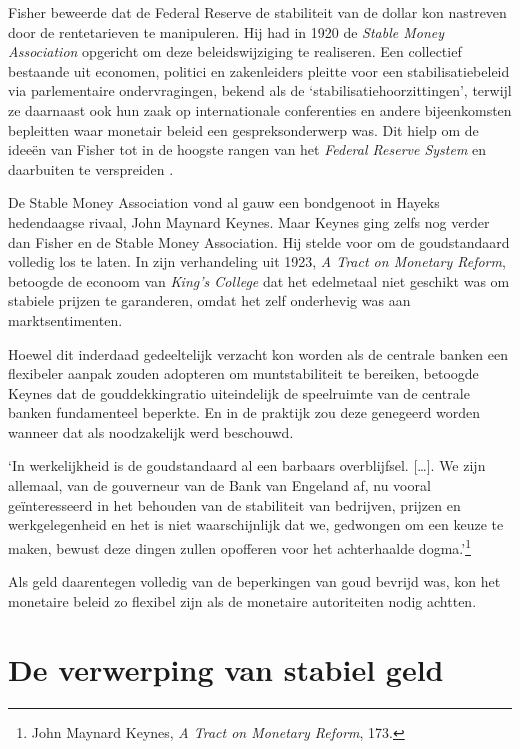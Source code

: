 \documentclass[
  a5paper,
  smalldemyvopaper,11pt,twoside,onecolumn,openright,extrafontsizes,
hidelinks]{memoir}
\renewenvironment{quote}%
               {\list{}{\rightmargin=.3cm\leftmargin=.3cm}%
                \itshape \item[]}%
               {\endlist}
\begin{document}
Fisher beweerde dat de Federal Reserve de stabiliteit van de dollar kon
nastreven door de rentetarieven te manipuleren. Hij had in 1920 de
\emph{Stable Money Association} opgericht om deze beleidswijziging te
realiseren. Een collectief bestaande uit economen, politici en
zakenleiders pleitte voor een stabilisatiebeleid via parlementaire
ondervragingen, bekend als de `stabilisatiehoorzittingen', terwijl ze
daarnaast ook hun zaak op internationale conferenties en andere
bijeenkomsten bepleitten waar monetair beleid een gespreksonderwerp was.
Dit hielp om de ideeën van Fisher tot in de hoogste rangen van het
\emph{Federal Reserve System} en daarbuiten te verspreiden .

De Stable Money Association vond al gauw een bondgenoot in Hayeks
hedendaagse rivaal, John Maynard Keynes. Maar Keynes ging zelfs nog
verder dan Fisher en de Stable Money Association. Hij stelde voor om de
goudstandaard volledig los te laten. In zijn verhandeling uit 1923,
\emph{A Tract on Monetary Reform}, betoogde de econoom van \emph{King's
College} dat het edelmetaal niet geschikt was om stabiele prijzen te
garanderen, omdat het zelf onderhevig was aan marktsentimenten.

Hoewel dit inderdaad gedeeltelijk verzacht kon worden als de centrale
banken een flexibeler aanpak zouden adopteren om muntstabiliteit te
bereiken, betoogde Keynes dat de gouddekkingratio uiteindelijk de
speelruimte van de centrale banken fundamenteel beperkte. En in de
praktijk zou deze genegeerd worden wanneer dat als noodzakelijk werd
beschouwd.

\begin{quote}
`In werkelijkheid is de goudstandaard al een barbaars overblijfsel.
{[}\ldots{]}. We zijn allemaal, van de gouverneur van de Bank van
Engeland af, nu vooral geïnteresseerd in het behouden van de stabiliteit
van bedrijven, prijzen en werkgelegenheid en het is niet waarschijnlijk
dat we, gedwongen om een keuze te maken, bewust deze dingen zullen
opofferen voor het achterhaalde dogma.'\footnote{\hspace{0pt}John
  Maynard Keynes, \emph{A Tract on Monetary Reform}, 173.}
\end{quote}

Als geld daarentegen volledig van de beperkingen van goud bevrijd was,
kon het monetaire beleid zo flexibel zijn als de monetaire autoriteiten
nodig achtten.

\section{De verwerping van stabiel
geld}\label{de-verwerping-van-stabiel-geld}
\end{document}
